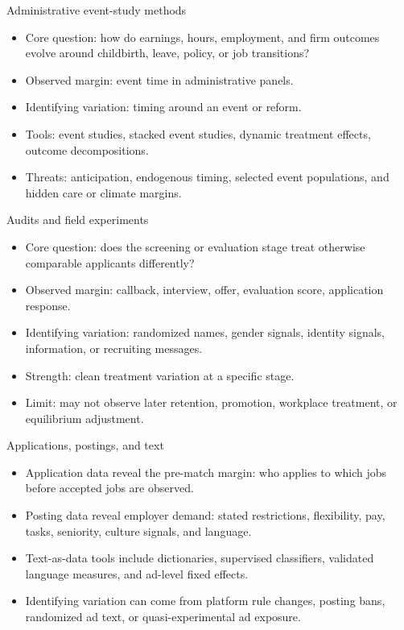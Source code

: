\documentclass[aspectratio=169,11pt]{beamer}
\begin{document}
\begin{frame}{Administrative event-study methods}
\begin{itemize}
    \item Core question: how do earnings, hours, employment, and firm outcomes evolve around childbirth, leave, policy, or job transitions?
    \item Observed margin: event time in administrative panels.
    \item Identifying variation: timing around an event or reform.
    \item Tools: event studies, stacked event studies, dynamic treatment effects, outcome decompositions.
    \item Threats: anticipation, endogenous timing, selected event populations, and hidden care or climate margins.
\end{itemize}
\end{frame}

\begin{frame}{Audits and field experiments}
\begin{itemize}
    \item Core question: does the screening or evaluation stage treat otherwise comparable applicants differently?
    \item Observed margin: callback, interview, offer, evaluation score, application response.
    \item Identifying variation: randomized names, gender signals, identity signals, information, or recruiting messages.
    \item Strength: clean treatment variation at a specific stage.
    \item Limit: may not observe later retention, promotion, workplace treatment, or equilibrium adjustment.
\end{itemize}
\end{frame}

\begin{frame}{Applications, postings, and text}
\begin{itemize}
    \item Application data reveal the pre-match margin: who applies to which jobs before accepted jobs are observed.
    \item Posting data reveal employer demand: stated restrictions, flexibility, pay, tasks, seniority, culture signals, and language.
    \item Text-as-data tools include dictionaries, supervised classifiers, validated language measures, and ad-level fixed effects.
    \item Identifying variation can come from platform rule changes, posting bans, randomized ad text, or quasi-experimental ad exposure.
\end{itemize}
\end{frame}
\end{document}

